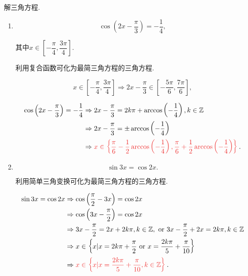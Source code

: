 \documentclass[8pt]{article}
\begin{document}
		解三角方程.
			\begin{enumerate}[label=\defmath{(\arabic*)}]
				\item \[\cos \left(2x - \dfrac{\pi}{3}\right) = -\dfrac{1}{4},\]

					其中\(x \in \left[-\dfrac{\pi}{4}, \dfrac{3\pi}{4}\right]\). 

					利用复合函数可化为最简三角方程的三角方程.

					\[x \in \left[-\dfrac{\pi}{4}, \dfrac{3\pi}{4}\right] \Rightarrow 2x-\dfrac{\pi}{3} \in \left[-\dfrac{5\pi}{6}, \dfrac{7\pi}{6}\right],\]

					\begin{align*}
						\cos \left(2x - \dfrac{\pi}{3}\right) = -\dfrac{1}{4} &\Rightarrow 2x-\frac{\pi}{3} = 2k\pi + \arccos \left(-\dfrac{1}{4}\right), k \in \ZZ\\
						&\Rightarrow 2x - \dfrac{\pi}{3} = \pm \arccos \left(-\dfrac{1}{4}\right)\\
						&\Rightarrow \ansmath{x \in \left\{\dfrac{\pi}{6} - \dfrac{1}{2} \arccos \left(-\dfrac{1}{4}\right), \dfrac{\pi}{6} + \dfrac{1}{2} \arccos \left(-\dfrac{1}{4}\right)\right\}}.
					\end{align*}

				\item \[\sin 3x = \cos 2x.\]


					利用简单三角变换可化为最简三角方程的三角方程.

					\begin{align*}
						\sin 3x = \cos 2x &\Rightarrow \cos \left(\frac{\pi}{2} - 3x\right) = \cos 2x\\
						&\Rightarrow \cos \left(3x - \dfrac{\pi}{2}\right) = \cos 2x\\
						&\Rightarrow 3x - \frac{\pi}{2} = 2x + 2k\pi, k\in \ZZ, \lgor 3x - \frac{\pi}{2} + 2x = 2k\pi, k \in \ZZ\\
						&\Rightarrow x \in \left\{x|x=2k\pi + \frac{\pi}{2} \lgor x = \frac{2k\pi}{5}  + \frac{\pi}{10}\right\}\\
						&\Rightarrow \ansmath{x \in \left\{x|x = \frac{2k\pi}{5} + \frac{\pi}{10}, k\in \ZZ\right\}}.
					\end{align*}

			\end{enumerate}
		~\\
\end{document}
